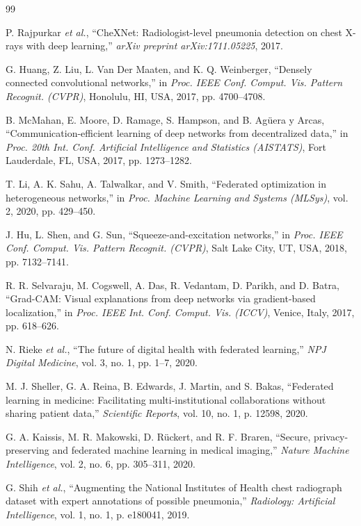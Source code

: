 \documentclass[12pt,a4paper]{report}
\begin{document}
\newpage
{}
\begin{thebibliography}{99}

P. Rajpurkar \textit{et al.}, ``CheXNet: Radiologist-level pneumonia detection on chest X-rays with deep learning,'' \textit{arXiv preprint arXiv:1711.05225}, 2017.

G. Huang, Z. Liu, L. Van Der Maaten, and K. Q. Weinberger, ``Densely connected convolutional networks,'' in \textit{Proc. IEEE Conf. Comput. Vis. Pattern Recognit. (CVPR)}, Honolulu, HI, USA, 2017, pp. 4700--4708.

B. McMahan, E. Moore, D. Ramage, S. Hampson, and B. Ag{\"u}era y Arcas, ``Communication-efficient learning of deep networks from decentralized data,'' in \textit{Proc. 20th Int. Conf. Artificial Intelligence and Statistics (AISTATS)}, Fort Lauderdale, FL, USA, 2017, pp. 1273--1282.

T. Li, A. K. Sahu, A. Talwalkar, and V. Smith, ``Federated optimization in heterogeneous networks,'' in \textit{Proc. Machine Learning and Systems (MLSys)}, vol. 2, 2020, pp. 429--450.

J. Hu, L. Shen, and G. Sun, ``Squeeze-and-excitation networks,'' in \textit{Proc. IEEE Conf. Comput. Vis. Pattern Recognit. (CVPR)}, Salt Lake City, UT, USA, 2018, pp. 7132--7141.

R. R. Selvaraju, M. Cogswell, A. Das, R. Vedantam, D. Parikh, and D. Batra, ``Grad-CAM: Visual explanations from deep networks via gradient-based localization,'' in \textit{Proc. IEEE Int. Conf. Comput. Vis. (ICCV)}, Venice, Italy, 2017, pp. 618--626.

N. Rieke \textit{et al.}, ``The future of digital health with federated learning,'' \textit{NPJ Digital Medicine}, vol. 3, no. 1, pp. 1--7, 2020.

M. J. Sheller, G. A. Reina, B. Edwards, J. Martin, and S. Bakas, ``Federated learning in medicine: Facilitating multi-institutional collaborations without sharing patient data,'' \textit{Scientific Reports}, vol. 10, no. 1, p. 12598, 2020.

G. A. Kaissis, M. R. Makowski, D. R{\"u}ckert, and R. F. Braren, ``Secure, privacy-preserving and federated machine learning in medical imaging,'' \textit{Nature Machine Intelligence}, vol. 2, no. 6, pp. 305--311, 2020.

G. Shih \textit{et al.}, ``Augmenting the National Institutes of Health chest radiograph dataset with expert annotations of possible pneumonia,'' \textit{Radiology: Artificial Intelligence}, vol. 1, no. 1, p. e180041, 2019.

\end{thebibliography}
\end{document}
